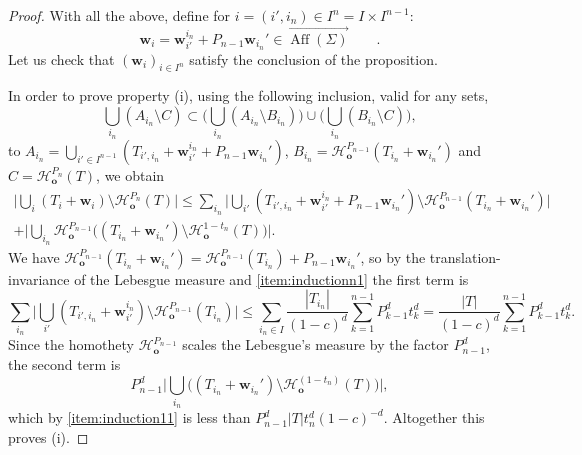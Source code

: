 \documentclass[10pt,a4paper]{amsart}
\begin{document}
\begin{proof}
With all the above, define for $i=(i',i_n)\in I^n=I\times I^{n-1}$:
\begin{equation*}
 \mathbf{w}_i=\mathbf{w}^{i_n}_{i'}+P_{n-1}\mathbf{w}_{i_n}'\in \overrightarrow{\operatorname{Aff}(\Sigma)}\qquad.
\end{equation*}
Let us check that $(\mathbf{w}_i)_{i \in I^n}$ satisfy the conclusion of the proposition. 

In order to prove property (i), using the following inclusion, valid for any sets,
\[ \bigcup_{i_n} (A_{i_n} \setminus C) \subset \Big(\bigcup_{i_n} (A_{i_n} \setminus B_{i_n})\Big) \cup \Big(\bigcup_{i_n} (B_{i_n} \setminus C)\Big),\]
to $A_{i_n} = \bigcup_{i' \in I^{n-1}} (T_{i',i_n}+\mathbf{w}_{i'}^{i_n}+P_{n-1}\mathbf{w}_{i_n}')$, $B_{i_n} = \mathcal{H}_{\mathbf{o}}^{P_{n-1}}(T_{i_n} + \mathbf{w}_{i_n}')$ and $C= \mathcal{H}_{\mathbf{o}}^{P_{n}}(T)$, we obtain
\begin{multline*}
    \Big| \bigcup_i (T_i + \mathbf{w}_i)\setminus \mathcal{H}_{\mathbf{o}}^{P_n}(T) \Big| \leq 
\sum_{i_n} \Big|\bigcup_{i'} (T_{i',i_n} + \mathbf{w}_{i'}^{i_n} + P_{n-1} \mathbf{w}_{i_n}')\setminus \mathcal{H}_{\mathbf{o}}^{P_{n-1}}(T_{i_n} + \mathbf{w}_{i_n}')\Big|\\
+ \Big| \bigcup_{i_n} \mathcal{H}_{\mathbf{o}}^{P_{n-1}}\big((T_{i_n} + \mathbf{w}_{i_n}') \setminus \mathcal{H}_{\mathbf{o}}^{1-t_n}(T)\big)\Big|.
\end{multline*} 
We have $\mathcal{H}_{\mathbf{o}}^{P_{n-1}}(T_{i_n} + \mathbf{w}_{i_n}') = \mathcal{H}_{\mathbf{o}}^{P_{n-1}}(T_{i_n}) + P_{n-1}\mathbf{w}_{i_n}'$, so by the translation-invariance of the Lebesgue measure and \ref{item:inductionn1} the first term is
\[\sum_{i_n} \Big|\bigcup_{i'} (T_{i',i_n} + \mathbf{w}_{i'}^{i_n})\setminus \mathcal{H}_{\mathbf{o}}^{P_{n-1}}(T_{i_n})\Big| \leq \sum_{i_n\in I} \frac{ |T_{i_n}|}{(1-c)^d}\sum_{k=1}^{n-1} P_{k-1}^dt_k^d = \frac{ |T|}{(1-c)^d}\sum_{k=1}^{n-1} P_{k-1}^dt_k^d.\]
Since the homothety $\mathcal{H}_{\mathbf{o}}^{P_{n-1}}$ scales the Lebesgue's measure by the factor $P_{n-1}^d$, the second term is
\[ P_{n-1}^d \Big| \bigcup_{i_n} \big( (T_{i_n} + \mathbf{w}_{i_n}') \setminus \mathcal{H}_{\mathbf{o}}^{(1-t_n)}(T)\big)\Big|,\]
which by \ref{item:induction11} is less than $P_{n-1}^d|T| t_n^d(1-c)^{-d}$. Altogether this proves (i).


\end{proof}
\end{document}
